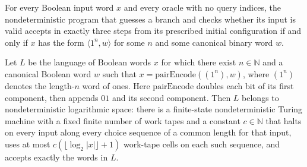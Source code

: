 \begin{lemma}
\label{Complexity.LogProg.guessValidA_ans}
\leanok
{}
For every Boolean input word $x$ and every oracle with no query indices, the
nondeterministic program that guesses a branch and checks whether its input is valid
accepts in exactly three steps from its prescribed initial configuration if and only if
$x$ has the form $\langle 1^n,w\rangle$ for some $n$ and some canonical binary word $w$.
\end{lemma}

\begin{theorem}
\label{Complexity.LogProg.validPlainLang_mem_NL}
\leanok
{}
Let $L$ be the language of Boolean words $x$ for which there exist $n\in\mathbb{N}$ and
a canonical Boolean word $w$ such that $x=\mathrm{pairEncode}((1^n),w)$, where $(1^n)$
denotes the length-$n$ word of ones. Here $\mathrm{pairEncode}$ doubles each bit of its
first component, then appends $01$ and its second component. Then $L$ belongs to
nondeterministic logarithmic space: there is a
finite-state nondeterministic Turing machine with a fixed finite number of work tapes
and a constant $c\in\mathbb N$ that halts on every input along every choice sequence of
a common length for that input, uses at most $c(\lfloor\log_2 |x|\rfloor+1)$ work-tape
cells on each such sequence, and accepts exactly the words in $L$.
\end{theorem}
